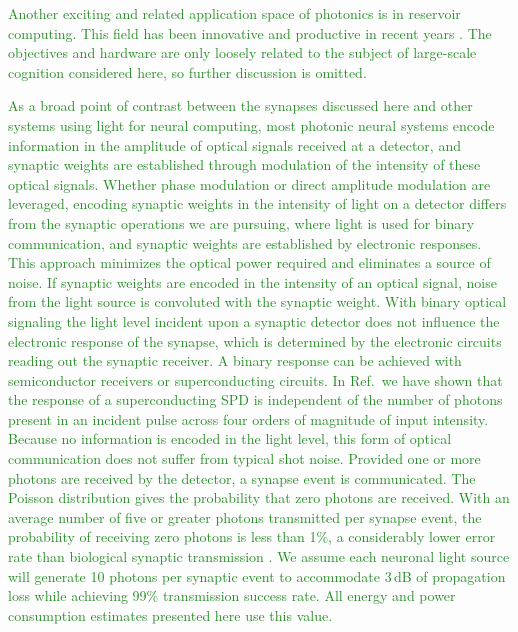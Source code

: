 \documentclass[twocolumn]{article}
\newcommand{\onlinecite}[1]{\hspace{-1 ex} \nocite{#1}\citenum{#1}}
\begin{document}
\textcolor{ForestGreen}{Another exciting and related application space of photonics is in reservoir computing. This field has been innovative and productive in recent years \cite{funa1993,vada2011,orso2015,vabr2017,brpe2018}. The objectives and hardware are only loosely related to the subject of large-scale cognition considered here, so further discussion is omitted.} 

\textcolor{ForestGreen}{As a broad point of contrast between the synapses discussed here and other systems using light for neural computing, most photonic neural systems encode information in the amplitude of optical signals received at a detector, and synaptic weights are established through modulation of the intensity of these optical signals. Whether phase modulation or direct amplitude modulation are leveraged, encoding synaptic weights in the intensity of light on a detector differs from the synaptic operations we are pursuing, where light is used for binary communication, and synaptic weights are established by electronic responses. This approach minimizes the optical power required and eliminates a source of noise. If synaptic weights are encoded in the intensity of an optical signal, noise from the light source is convoluted with the synaptic weight. With binary optical signaling the light level incident upon a synaptic detector does not influence the electronic response of the synapse, which is determined by the electronic circuits reading out the synaptic receiver. A binary response can be achieved with semiconductor receivers or superconducting circuits. In Ref.\,\onlinecite{buta2020_2} we have shown that the response of a superconducting SPD is independent of the number of photons present in an incident pulse across four orders of magnitude of input intensity. Because no information is encoded in the light level, this form of optical communication does not suffer from typical shot noise. Provided one or more photons are received by the detector, a synapse event is communicated. The Poisson distribution gives the probability that zero photons are received. With an average number of five or greater photons transmitted per synapse event, the probability of receiving zero photons is less than 1\%, a considerably lower error rate than biological synaptic transmission \cite{li1997}. We assume each neuronal light source will generate 10 photons per synaptic event to accommodate 3\,dB of propagation loss while achieving 99\% transmission success rate. All energy and power consumption estimates presented here use this value.}
\end{document}
